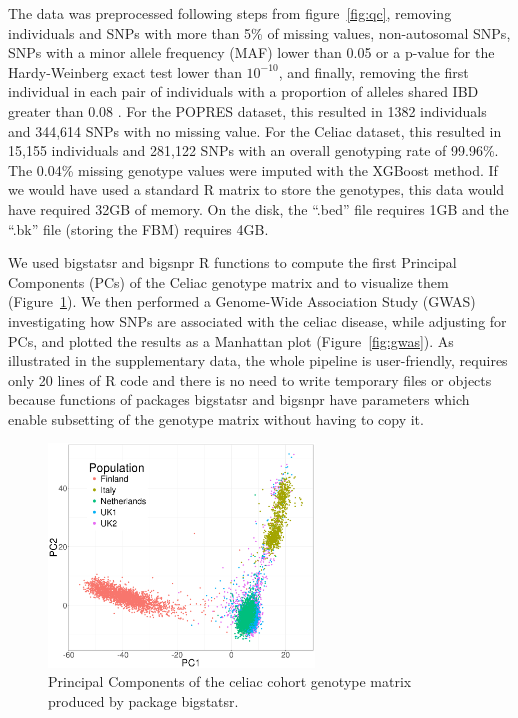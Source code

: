 \documentclass{bioinfo}
\begin{document}
The data was preprocessed following steps from figure~\ref{fig:qc}, removing individuals and SNPs with more than 5\% of missing values, non-autosomal SNPs, SNPs with a minor allele frequency (MAF) lower than 0.05 or a p-value for the Hardy-Weinberg exact test lower than $10^{-10}$, and finally, removing the first individual in each pair of individuals with a proportion of alleles shared IBD greater than 0.08 \cite[]{Purcell2007}. 
For the POPRES dataset, this resulted in 1382 individuals and 344,614 SNPs with no missing value.
For the Celiac dataset, this resulted in 15,155 individuals and 281,122 SNPs with an overall genotyping rate of 99.96\%. The 0.04\% missing genotype values were imputed with the XGBoost method. If we would have used a standard R matrix to store the genotypes, this data would have required 32GB of memory. On the disk, the ``.bed'' file requires 1GB and the ``.bk'' file (storing the FBM) requires 4GB. 

We used bigstatsr and bigsnpr R functions to compute the first Principal Components (PCs) of the Celiac genotype matrix and to visualize them (Figure~\ref{fig:pca}). We then performed a Genome-Wide Association Study (GWAS) investigating how SNPs are associated with the celiac disease, while adjusting for PCs, and plotted the results as a Manhattan plot (Figure~\ref{fig:gwas}). As illustrated in the supplementary data, the whole pipeline is user-friendly, requires only 20 lines of R code and there is no need to write temporary files or objects because functions of packages bigstatsr and bigsnpr have parameters which enable subsetting of the genotype matrix without having to copy it. 

\begin{figure}[!tpb]
\centerline{\includegraphics[width=200pt]{celiac-pca}}
\caption{Principal Components of the celiac cohort genotype matrix produced by package bigstatsr.}\label{fig:pca}
\end{figure}
\end{document}
